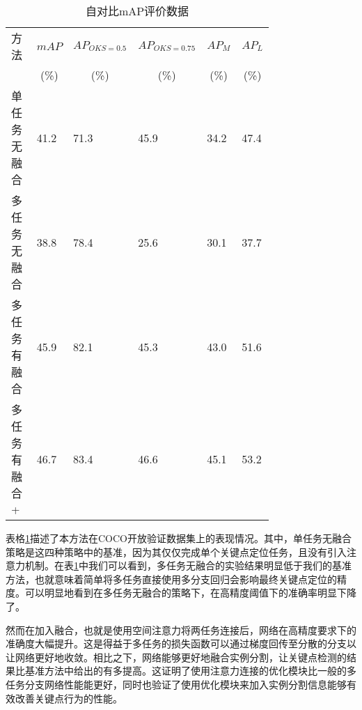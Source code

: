 \begin{table}[ht]
	\centering
	\caption{自对比mAP评价数据}
	\label{tab:mAPCOCOselfbenchmark}
	\begin{minipage}{0.8\linewidth}
		\begin{tabular}{p{0.25\linewidth}p{0.1\linewidth}<{\centering}p{0.1\linewidth}<{\centering}p{0.1\linewidth}<{\centering}p{0.1\linewidth}<{\centering}p{0.1\linewidth}<{\centering}}
			\hline
			方法 & \multicolumn{1}{c}{$mAP$} & \multicolumn{1}{c}{$AP_{OKS=0.5}$} & \multicolumn{1}{c}{$AP_{OKS=0.75}$} 
			& \multicolumn{1}{c}{$AP_M$} & \multicolumn{1}{c}{$AP_L$} \\
			
			& \multicolumn{1}{c}{(\%)}& \multicolumn{1}{c}{(\%)}&
			\multicolumn{1}{c}{(\%)}& \multicolumn{1}{c}{(\%)}& \multicolumn{1}{c}{
				(\%)}\\
			\hline
			单任务无融合 & 41.2 & 71.3 & 45.9& 34.2& 47.4\\
			多任务无融合 & 38.8 & 78.4 & 25.6 & 30.1 & 37.7 \\
			多任务有融合 & 45.9 & 82.1 & 45.3 & 43.0 & 51.6 \\
			多任务有融合+ & 46.7 & 83.4 & 46.6 & 45.1 & 53.2 \\
			\hline
		\end{tabular}
	\end{minipage}
\end{table}

表格\ref{tab:mAPCOCOselfbenchmark}描述了本方法在COCO开放验证数据集上的表现情况。其中，单任务无融合策略是这四种策略中的基准，因为其仅仅完成单个关键点定位任务，且没有引入注意力机制。在表\ref{tab:mAPCOCOselfbenchmark}中我们可以看到，多任务无融合的实验结果明显低于我们的基准方法，也就意味着简单将多任务直接使用多分支回归会影响最终关键点定位的精度。可以明显地看到在多任务无融合的策略下，在高精度阈值下的准确率明显下降了。

然而在加入融合，也就是使用空间注意力将两任务连接后，网络在高精度要求下的准确度大幅提升。这是得益于多任务的损失函数可以通过梯度回传至分散的分支以让网络更好地收敛。相比之下，网络能够更好地融合实例分割，让关键点检测的结果比基准方法中给出的有多提高。这证明了使用注意力连接的优化模块比一般的多任务分支网络性能能更好，同时也验证了使用优化模块来加入实例分割信息能够有效改善关键点行为的性能。

